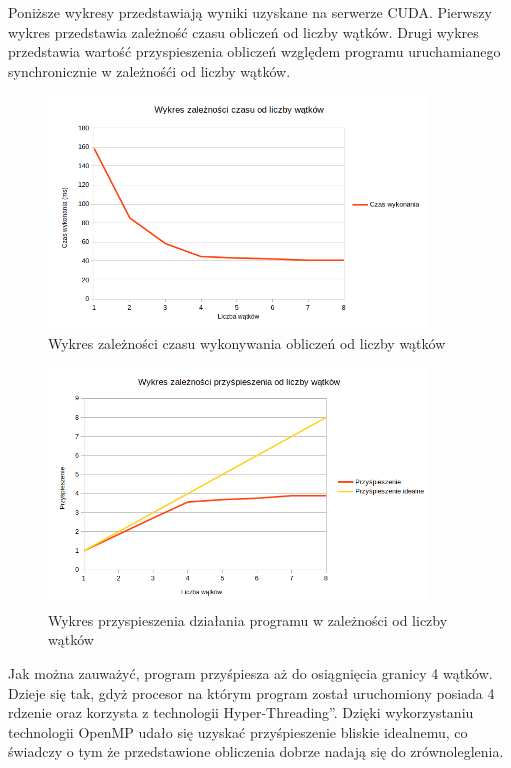 \documentclass[a4paper,12pt]{article}
\begin{document}
Poniższe wykresy przedstawiają wyniki uzyskane na serwerze CUDA. Pierwszy wykres przedstawia zależność czasu obliczeń od liczby wątków. Drugi wykres przedstawia wartość przyspieszenia obliczeń względem programu uruchamianego synchronicznie w zależnośći od liczby wątków.

\begin{figure}[!ht]
	\centering
  \includegraphics[width=0.9\textwidth]{wykresCzas.png}
  \caption{Wykres zależności czasu wykonywania obliczeń od liczby wątków}
\end{figure}

\begin{figure}[!ht]
	\centering
  \includegraphics[width=0.9\textwidth]{wykresPrzyspieszenie.png}
  \caption{Wykres przyspieszenia działania programu w zależności od liczby wątków}
\end{figure}


Jak można zauważyć, program przyśpiesza aż do osiągnięcia granicy 4 wątków. Dzieje się tak, gdyż procesor na którym program został uruchomiony posiada 4 rdzenie oraz korzysta z technologii \quotedblbase Hyper-Threading\textquotedblright.
Dzięki wykorzystaniu technologii OpenMP udało się uzyskać przyśpieszenie bliskie idealnemu, co świadczy o tym że przedstawione obliczenia dobrze nadają się do zrównoleglenia.
\end{document}
